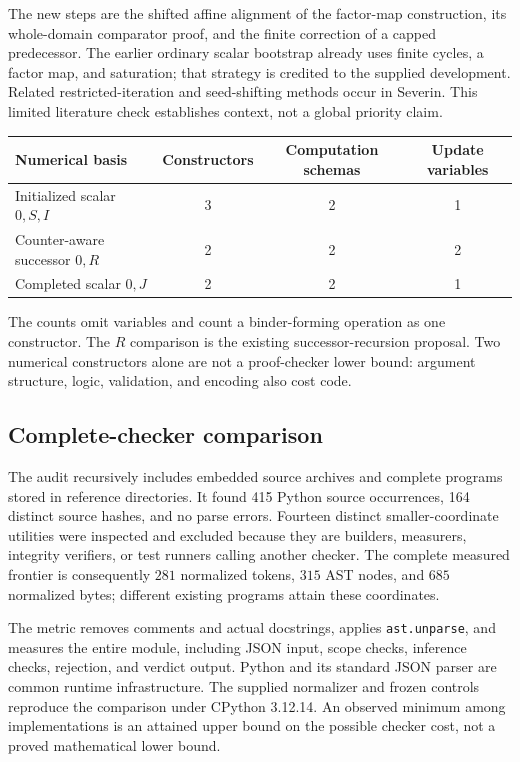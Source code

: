 \documentclass[11pt,letterpaper]{article}
\theoremstyle{definition}\newtheorem{definition}[theorem]{Definition}
\theoremstyle{remark}\newtheorem{remark}[theorem]{Remark}
\begin{document}
The new steps are the shifted affine alignment of the factor-map
construction, its whole-domain comparator proof, and the finite correction
of a capped predecessor. The earlier ordinary scalar bootstrap already
uses finite cycles, a factor map, and saturation; that strategy is credited
to the supplied development\cite{generated}. Related restricted-iteration
and seed-shifting methods occur in Severin\cite{severin}. This limited
literature check establishes context, not a global priority claim.

\begin{center}
\begin{tabular}{lccc}
\toprule
Numerical basis & Constructors & Computation schemas & Update variables\\
\midrule
Initialized scalar $0,S,I$ & 3 & 2 & 1\\
Counter-aware successor $0,R$ & 2 & 2 & 2\\
Completed scalar $0,J$ & 2 & 2 & 1\\
\bottomrule
\end{tabular}
\end{center}
The counts omit variables and count a binder-forming operation as one
constructor. The $R$ comparison is the existing successor-recursion
proposal\cite{successor}. Two numerical constructors alone are not a
proof-checker lower bound: argument structure, logic, validation, and
encoding also cost code.

\subsection{Complete-checker comparison}

The audit recursively includes embedded source archives and complete
programs stored in reference directories. It found 415 Python source
occurrences, 164 distinct source hashes, and no parse errors. Fourteen
distinct smaller-coordinate utilities were inspected and excluded because
they are builders, measurers, integrity verifiers, or test runners calling
another checker. The complete measured frontier is consequently
$281$ normalized tokens, $315$ AST nodes, and $685$ normalized bytes;
different existing programs attain these coordinates.

The metric removes comments and actual docstrings, applies
\texttt{ast.unparse}, and measures the entire module, including JSON input,
scope checks, inference checks, rejection, and verdict output. Python and
its standard JSON parser are common runtime infrastructure. The supplied
normalizer and frozen controls reproduce the comparison under CPython
3.12.14. An observed minimum among implementations is an attained upper
bound on the possible checker cost, not a proved mathematical lower bound.
\end{document}
